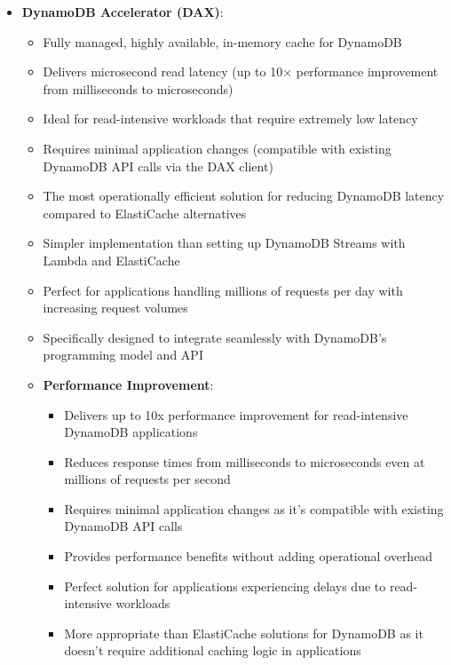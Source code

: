 \documentclass[11pt,a4paper]{report}
\begin{document}
\begin{itemize}
\begin{itemize}
  \item Reduces storage costs and overhead for cleaning up stale data
  \item Ideal for data with a known expiration requirement (e.g., 30 days)
  \item Expired items are auto-deleted (within \textasciitilde{}24-48 hours) without consuming write throughput
  \item TTL feature confirmed as an effective, cost-saving mechanism
\end{itemize}
  \item \textbf{DynamoDB Accelerator (DAX)}:
\begin{itemize}
  \item Fully managed, highly available, in-memory cache for DynamoDB
  \item Delivers microsecond read latency (up to 10× performance improvement from milliseconds to microseconds)
  \item Ideal for read-intensive workloads that require extremely low latency
  \item Requires minimal application changes (compatible with existing DynamoDB API calls via the DAX client)
  \item The most operationally efficient solution for reducing DynamoDB latency compared to ElastiCache alternatives
  \item Simpler implementation than setting up DynamoDB Streams with Lambda and ElastiCache
  \item Perfect for applications handling millions of requests per day with increasing request volumes
  \item Specifically designed to integrate seamlessly with DynamoDB's programming model and API
  \item \textbf{Performance Improvement}:
\begin{itemize}
  \item Delivers up to 10x performance improvement for read-intensive DynamoDB applications
  \item Reduces response times from milliseconds to microseconds even at millions of requests per second
  \item Requires minimal application changes as it's compatible with existing DynamoDB API calls
  \item Provides performance benefits without adding operational overhead
  \item Perfect solution for applications experiencing delays due to read-intensive workloads
  \item More appropriate than ElastiCache solutions for DynamoDB as it doesn't require additional caching logic in applications

\end{itemize}
\end{itemize}
\end{itemize}
\end{document}
